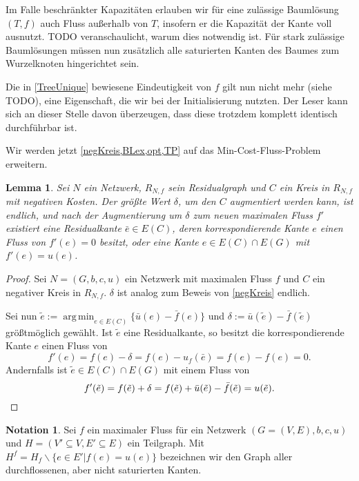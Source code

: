 \documentclass[a4paper,twoside,ngerman]{report}
\DeclareMathOperator*{\argmin}{arg\,min}
\theoremstyle{plain}
\newtheorem{lem}[thm]{Lemma}
\theoremstyle{definition}
\newtheorem*{nota}{Notation}
\begin{document}
Im Falle beschränkter Kapazitäten erlauben wir für eine zulässige Baumlösung $(T,f)$ auch Fluss außerhalb von $T$, insofern er die Kapazität der Kante voll ausnutzt. TODO veranschaulicht, warum dies notwendig ist. Für stark zulässige Baumlösungen müssen nun zusätzlich alle saturierten Kanten des Baumes zum Wurzelknoten hingerichtet sein.

Die in \cref{TreeUnique} bewiesene Eindeutigkeit von $f$ gilt nun nicht mehr (siehe TODO), eine Eigenschaft, die wir bei der Initialisierung nutzten. Der Leser kann sich an dieser Stelle davon überzeugen, dass diese trotzdem komplett identisch durchführbar ist.

Wir werden jetzt \cref{negKreis,BLex,opt,TP} auf das Min-Cost-Fluss-Problem erweitern.

\begin{lem}\label{negKreis2}Sei $N$ ein Netzwerk, $R_{N,f}$ sein Residualgraph und $C$ ein Kreis in $R_{N,f}$ mit negativen Kosten. Der größte Wert $\delta$, um den $C$ augmentiert werden kann, ist endlich, und nach der Augmentierung um $\delta$ zum neuen maximalen Fluss $f'$ existiert eine Residualkante $\bar{e}\in E(C)$, deren korrespondierende Kante $e$ einen Fluss von $f'(e)=0$ besitzt, oder eine Kante $e\in E(C)\cap E(G)$ mit $f'(e)=u(e)$.\end{lem}
\begin{proof}Sei $N=(G,b,c,u)$ ein Netzwerk mit maximalen Fluss $f$ und $C$ ein negativer Kreis in $R_{N,f}$. $\delta$ ist analog zum Beweis von \cref{negKreis} endlich.
	
Sei nun $\tilde{e}:=\argmin_{e\in E(C)}\{\bar{u}(e)-\bar{f}(e)\}$ und $\delta:=\bar{u}(\tilde{e})-\bar{f}(\tilde{e})$ größtmöglich gewählt. Ist $\tilde{e}$ eine Residualkante, so besitzt die korrespondierende Kante $e$ einen Fluss von
\begin{equation*}
f'(e)=f(e)-\delta=f(e)-u_f(\bar{e})=f(e)-f(e)=0.\end{equation*} Andernfalls ist $\tilde{e}\in E(C)\cap E(G)$ mit einem Fluss von
\begin{equation*}
f'(\tilde{e})=f(\tilde{e})+\delta=f(\tilde{e})+\bar{u}(\tilde{e})-\bar{f}(\tilde{e})=u(\tilde{e}).\qedhere\end{equation*}\end{proof}

\begin{nota}Sei $f$ ein maximaler Fluss für ein Netzwerk $(G=(V,E),b,c,u)$ und $H=(V'\subseteq V, E'\subseteq E)$ ein Teilgraph. Mit $H^f=H_f\backslash\{e\in E'|f(e)=u(e)\}$ bezeichnen wir den Graph aller durchflossenen, aber nicht saturierten Kanten.\end{nota}
\end{document}
